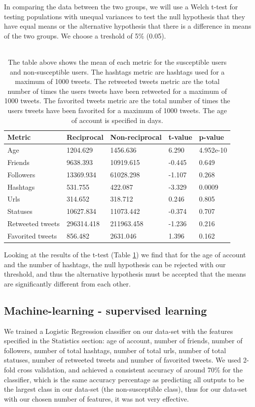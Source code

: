 \documentclass[10pt]{IEEEtran}
\begin{document}
In comparing the data between the two groups, we will use a Welch t-test for testing populations with unequal variances to test the null hypothesis that they have equal means or the alternative hypothesis that there is a difference in means of the two groups.
We choose a treshold of 5\% (0.05).
\\\\
\begin{table}[H]
\centering
\begin{tabular}{lllll}
\hline
Metric & Reciprocal & Non-reciprocal & t-value & p-value \\ \hline
Age & 1204.629 & 1456.636 & 6.290 & 4.952e-10\\
Friends & 9638.393 & 10919.615 & -0.445 & 0.649 \\
Followers & 13369.934 & 61028.298 & -1.107 & 0.268 \\
Hashtags & 531.755 & 422.087 & -3.329 & 0.0009 \\
Urls & 314.652 & 318.712 & 0.246 & 0.805 \\
Statuses & 10627.834 & 11073.442 & -0.374 & 0.707 \\
Retweeted tweets & 296314.418 & 211963.458 & -1.236 & 0.216 \\
Favorited tweets & 856.482 & 2631.046 & 1.396 & 0.162 \\ \hline
\end{tabular}
\caption{The table above shows the mean of each metric for the susceptible users and non-susceptible users. The hashtags metric are hashtags used for a maximum of 1000 tweets. The retweeted tweets metric are the total number of times the users tweets have been retweeted for a maximum of 1000 tweets. The favorited tweets metric are the total number of times the users tweets have been favorited for a maximum of 1000 tweets. The age of account is specified in days.}
\label{tab:t_test}
\end{table}
Looking at the results of the t-test (Table \ref{tab:t_test}) we find that for the age of account and the number of hashtags, the null hypothesis can be rejected with our threshold, and thus the alternative hypothesis must be accepted that the means are significantly different from each other.\\

\subsection{Machine-learning - supervised learning}
We trained a Logistic Regression classifier on our data-set with the features specified in the Statistics section: age of account, number of friends, number of followers, number of total hashtags, number of total urls, number of total statuses, number of retweeted tweets and number of favorited tweets. We used 2-fold cross validation, and achieved a consistent accuracy of around 70\% for the classifier, which is the same accuracy percentage as predicting all outputs to be the largest class in our data-set (the non-susceptible class), thus for our data-set with our chosen number of features, it was not very effective.  
\end{document}
